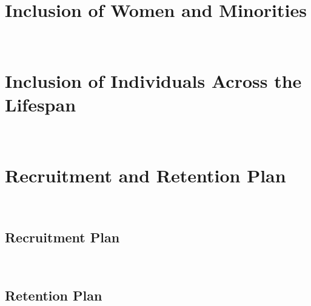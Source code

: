 \newpage

\section*{Inclusion of Women and Minorities}

~

\lipsum[6]

\newpage

\section*{Inclusion of Individuals Across the Lifespan}

~

\lipsum[11] 

\newpage

\section*{Recruitment and Retention Plan}

~

\subsection*{Recruitment Plan}

\lipsum[12]

~

\subsection*{Retention Plan}

\lipsum[12]

